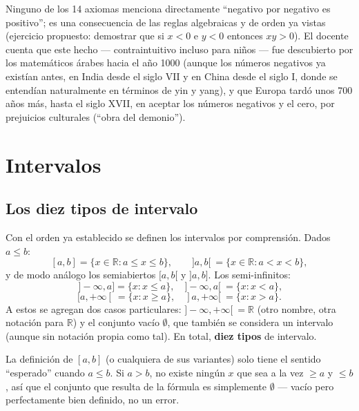 \documentclass[12pt,a4paper]{article}
\begin{document}
\begin{notebox}
Ninguno de los 14 axiomas menciona directamente ``negativo por negativo es
positivo''; es una consecuencia de las reglas algebraicas y de orden ya
vistas (ejercicio propuesto: demostrar que si $x<0$ e $y<0$ entonces
$xy>0$). El docente cuenta que este hecho --- contraintuitivo incluso para
niños --- fue descubierto por los matemáticos árabes hacia el año 1000
(aunque los números negativos ya existían antes, en India desde el siglo
VII y en China desde el siglo I, donde se entendían naturalmente en
términos de yin y yang), y que Europa tardó unos 700 años más, hasta el
siglo XVII, en aceptar los números negativos y el cero, por prejuicios
culturales (``obra del demonio'').
\end{notebox}

\section{Intervalos}

\subsection{Los diez tipos de intervalo}

Con el orden ya establecido se definen los intervalos por comprensión.
Dados $a \leq b$:
$$
[a,b] = \{x \in \mathbb{R} : a \leq x \leq b\}, \qquad
]a,b[ \ = \{x \in \mathbb{R} : a < x < b\},
$$
y de modo análogo los semiabiertos $[a,b[$ y $]a,b]$. Los semi-infinitos:
$$
\;]-\infty,a] = \{x : x \leq a\}, \quad ]-\infty,a[\ = \{x : x < a\},
$$
$$
[a,+\infty[\ = \{x : x \geq a\}, \quad ]a,+\infty[\ = \{x : x > a\}.
$$
A estos se agregan dos casos particulares: $]-\infty,+\infty[\ = \mathbb{R}$
(otro nombre, otra notación para $\mathbb{R}$) y el conjunto vacío
$\emptyset$, que también se considera un intervalo (aunque sin notación
propia como tal). En total, \textbf{diez tipos} de intervalo.

\begin{warnbox}
La definición de $[a,b]$ (o cualquiera de sus variantes) solo tiene el
sentido ``esperado'' cuando $a \leq b$. Si $a > b$, no existe ningún $x$
que sea a la vez $\geq a$ y $\leq b$, así que el conjunto que resulta de la
fórmula es simplemente $\emptyset$ --- vacío pero perfectamente bien
definido, no un error.
\end{warnbox}


\end{document}
